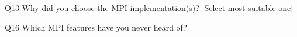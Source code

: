 \begin{description}%
\item{Q13} Why did you choose the MPI implementation(s)? [Select most suitable one]%
\item{Q16} Which MPI features have you never heard of?%
\end{description}%
